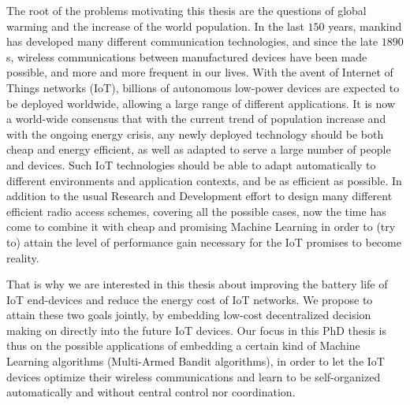 %
The root of the problems motivating this thesis are the questions of global warming and the increase of the world population.
In the last $150$ years, mankind has developed many different communication technologies, and since the late $1890$s, wireless communications between manufactured devices have been made possible, and more and more frequent in our lives.
With the avent of Internet of Things networks (IoT), billions of autonomous low-power devices are expected to be deployed worldwide, allowing a large range of different applications.
It is now a world-wide consensus that with the current trend of population increase and with the ongoing energy crisis, any newly deployed technology should be both cheap and energy efficient,
as well as adapted to serve a large number of people and devices.
%
Such IoT technologies should be able to adapt automatically to different environments and application contexts, and be as efficient as possible.
%
In addition to the usual Research and Development effort to design many different efficient radio access schemes, covering all the possible cases,
now the time has come to combine it with cheap and promising Machine Learning in order to (try to) attain the level of performance gain necessary for the IoT promises to become reality.

That is why we are interested in this thesis about
improving the battery life of IoT end-devices and reduce the energy cost of IoT networks.
We propose to attain these two goals jointly, by embedding low-cost decentralized decision making on directly into the future IoT devices.
%
Our focus in this PhD thesis is thus on the possible applications of embedding a certain kind of Machine Learning algorithms (Multi-Armed Bandit algorithms), in order to let the IoT devices optimize their wireless communications and learn to be self-organized automatically and without central control nor coordination.


